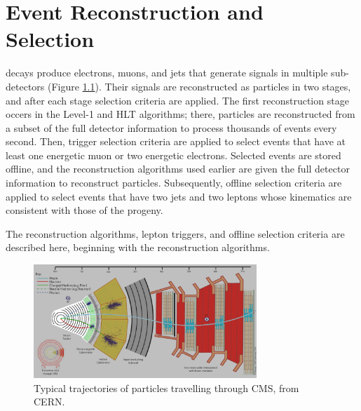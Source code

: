 \chapter{Event Reconstruction and Selection}
\label{sec:reco_chapter}

\WR decays produce electrons, muons, and jets that generate signals in multiple sub-detectors (Figure 
\ref{fig:particleTrajectories}).  Their signals are reconstructed as particles in two stages, and after each stage selection 
criteria are applied.  The first reconstruction stage occers in the Level-1 and HLT algorithms; there, particles are reconstructed 
from a subset of the full detector information to process thousands of events every second.  Then, trigger selection criteria are 
applied to select events that have at least one energetic muon or two energetic electrons.  Selected events are stored offline, and 
the reconstruction algorithms used earlier are given the full detector information to reconstruct particles.  Subsequently, offline 
selection criteria are applied to select events that have two jets and two leptons whose kinematics are consistent with those of the 
\WR progeny.

The reconstruction algorithms, lepton triggers, and offline selection criteria are described here, beginning with the reconstruction 
algorithms.

\begin{figure}[h]
	\centering
	\includegraphics[width=0.75\textwidth]{figures/flowOfParticlesThroughCMS.png}
	\caption{Typical trajectories of particles travelling through CMS, from CERN.}
	\label{fig:particleTrajectories}
\end{figure}


